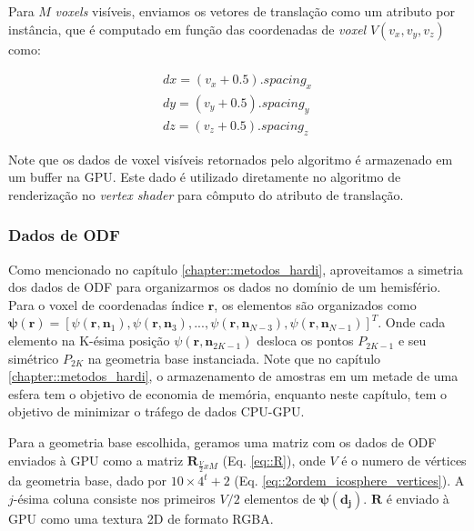 Para $M$ \textit{voxels} visíveis, enviamos os vetores de translação como um atributo por instância, que é computado em função das coordenadas de \textit{voxel} $V(v_x, v_y, v_z)$ como:

\begin{align}
 \label{eq::translation}
    dx = (v_x + 0.5).spacing_x \nonumber\\
    dy = (v_y + 0.5).spacing_y \\
    dz = (v_z + 0.5).spacing_z \nonumber
\end{align}

Note que os dados de voxel visíveis retornados pelo algoritmo é armazenado em um buffer na GPU. Este dado é utilizado diretamente no algoritmo de renderização no \textit{vertex shader} para cômputo do atributo de translação.

\subsubsection{Dados de ODF}
\label{sssec::dados_de_odf}

Como mencionado no capítulo \ref{chapter::metodos_hardi}, aproveitamos a simetria dos dados de ODF para organizarmos os dados no domínio de um hemisfério. Para o voxel de coordenadas índice $\mathbf{r}$, os elementos são organizados como $\boldsymbol{\psi}(\mathbf{r}) = [
\psi(\mathbf{r}, \mathbf{n}_1),
\psi(\mathbf{r}, \mathbf{n}_3), ...,
\psi(\mathbf{r}, \mathbf{n}_{N-3}),
\psi(\mathbf{r}, \mathbf{n}_{N-1})]^T$. Onde cada elemento na K-ésima posição $\psi(\mathbf{r}, \mathbf{n}_{2K-1})$ desloca os pontos $P_{2K-1}$ e seu simétrico $P_{2K}$ na geometria base instanciada. Note que no capítulo \ref{chapter::metodos_hardi}, o armazenamento de amostras em um metade de uma esfera tem o objetivo de economia de memória, enquanto neste capítulo, tem o objetivo de minimizar o tráfego de dados CPU-GPU.

Para a geometria base escolhida, geramos uma matriz com os dados de ODF enviados à GPU como a matriz $\mathbf{R}_{\frac{V}{2}xM}$ (Eq. \ref{eq::R}), onde $V$ é o numero de vértices da geometria base, dado por $10 \times 4^t + 2$ (Eq. \ref{eq::2ordem_icosphere_vertices}). A $j$-ésima coluna consiste nos primeiros $V/2$ elementos de $\boldsymbol{\psi}(\mathbf{d_j})$. $\mathbf{R}$ é enviado à GPU como uma textura 2D de formato RGBA.

